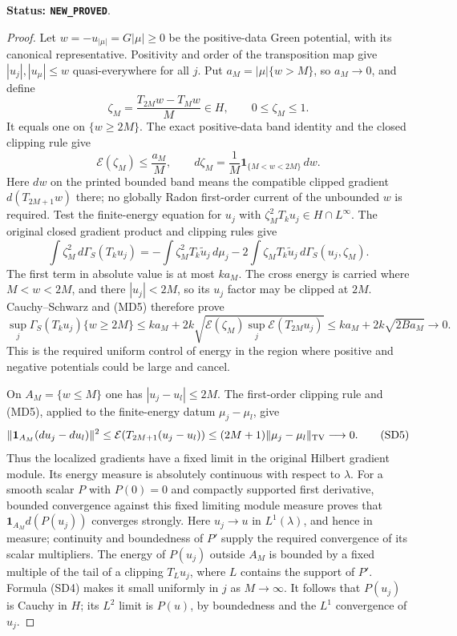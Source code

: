 \noindent\textbf{Status: \texttt{NEW\_PROVED}}.

\begin{proof}
Let $w=-u_{|\mu|}=G|\mu|\ge0$ be the positive-data Green
potential, with its canonical representative.  Positivity and
order of the transposition map give
$|u_j|,|u_\mu|\le w$ quasi-everywhere for all $j$.
Put $a_M=|\mu|\{w>M\}$, so $a_M\to0$, and define
\[
          \zeta_M=\frac{T_{2M}w-T_Mw}{M}\in H,\qquad
          0\le\zeta_M\le1.
\]
It equals one on $\{w\ge2M\}$.  The exact positive-data
band identity and the closed clipping rule give
\[
 \mathcal E(\zeta_M)\le\frac{a_M}{M},\qquad
 d\zeta_M=\frac1M\mathbf1_{\{M<w<2M\}}\,dw.
 \tag{SD3}
\]
Here $dw$ on the printed bounded band means the compatible
clipped gradient $d(T_{2M+1}w)$ there; no globally Radon
first-order current of the unbounded $w$ is required.
Test the finite-energy equation for $u_j$ with
$\zeta_M^2T_ku_j\in H\cap L^\infty$.
The original closed gradient product and clipping rules give
\[
 \int\zeta_M^2\,d\Gamma_S(T_ku_j)
  =-\int\zeta_M^2 T_k\widetilde u_j\,d\mu_j
                  -2\int\zeta_M T_k\widetilde u_j\,
                                      d\Gamma_S(u_j,\zeta_M).
\]
The first term in absolute value is at most $k a_M$.
The cross energy is carried where $M<w<2M$, and there
$|u_j|<2M$, so its $u_j$ factor may be clipped at $2M$.
Cauchy--Schwarz and (MD5) therefore prove
\[
 \sup_j\Gamma_S(T_ku_j)\{w\ge2M\}
   \le k a_M+2k\sqrt{\mathcal E(\zeta_M)
                                 \sup_j\mathcal E(T_{2M}u_j)}
   \le k a_M+2k\sqrt{2B a_M}\longrightarrow0.
 \tag{SD4}
\]
This is the required uniform control of energy in the region
where positive and negative potentials could be large and cancel.

On $A_M=\{w\le M\}$ one has $|u_j-u_l|\le2M$.
The first-order clipping rule and (MD5), applied to the
finite-energy datum $\mu_j-\mu_l$, give
\[
 \|\mathbf1_{A_M}(du_j-du_l)\|^2
      \le\mathcal E(T_{2M+1}(u_j-u_l))
      \le(2M+1)\|\mu_j-\mu_l\|_{\rm TV}\longrightarrow0.
 \tag{SD5}
\]
Thus the localized gradients have a fixed limit in the
original Hilbert gradient module.  Its energy measure is
absolutely continuous with respect to $\lambda$.
For a smooth scalar $P$ with $P(0)=0$ and compactly supported
first derivative, bounded convergence against this fixed
limiting module measure proves that
$\mathbf1_{A_M}d(P(u_j))$ converges strongly.
Here $u_j\to u$ in $L^1(\lambda)$, and hence in measure;
continuity and boundedness of $P'$ supply the required
convergence of its scalar multipliers.
The energy of $P(u_j)$ outside $A_M$ is bounded by a fixed
multiple of the tail of a clipping $T_Lu_j$, where $L$
contains the support of $P'$.  Formula (SD4) makes it small
uniformly in $j$ as $M\to\infty$.
It follows that $P(u_j)$ is Cauchy in $H$; its $L^2$ limit
is $P(u)$, by boundedness and the $L^1$ convergence of $u_j$.


\end{proof}
